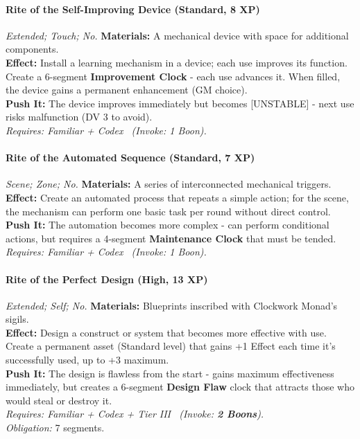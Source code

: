 \paragraph{Rite of the Self-Improving Device (Standard, 8 XP)} \emph{Extended; Touch; No.}
\textbf{Materials:} A mechanical device with space for additional components. \\
\textbf{Effect:} Install a learning mechanism in a device; each use improves its function. Create a 6-segment \textbf{Improvement Clock} - each use advances it. When filled, the device gains a permanent enhancement (GM choice). \\
\textbf{Push It:} The device improves immediately but becomes [UNSTABLE] - next use risks malfunction (DV 3 to avoid). \\
\emph{Requires: Familiar + Codex \ (\textit{Invoke:} 1 Boon).}

\paragraph{Rite of the Automated Sequence (Standard, 7 XP)} \emph{Scene; Zone; No.}
\textbf{Materials:} A series of interconnected mechanical triggers. \\
\textbf{Effect:} Create an automated process that repeats a simple action; for the scene, the mechanism can perform one basic task per round without direct control. \\
\textbf{Push It:} The automation becomes more complex - can perform conditional actions, but requires a 4-segment \textbf{Maintenance Clock} that must be tended. \\
\emph{Requires: Familiar + Codex \ (\textit{Invoke:} 1 Boon).}

\paragraph{Rite of the Perfect Design (High, 13 XP)} \emph{Extended; Self; No.}
\textbf{Materials:} Blueprints inscribed with Clockwork Monad's sigils. \\
\textbf{Effect:} Design a construct or system that becomes more effective with use. Create a permanent asset (Standard level) that gains +1 Effect each time it's successfully used, up to +3 maximum. \\
\textbf{Push It:} The design is flawless from the start - gains maximum effectiveness immediately, but creates a 6-segment \textbf{Design Flaw} clock that attracts those who would steal or destroy it. \\
\emph{Requires: Familiar + Codex + Tier III \ (\textit{Invoke:} \textbf{2 Boons}).} \\
\emph{Obligation:} 7 segments.


